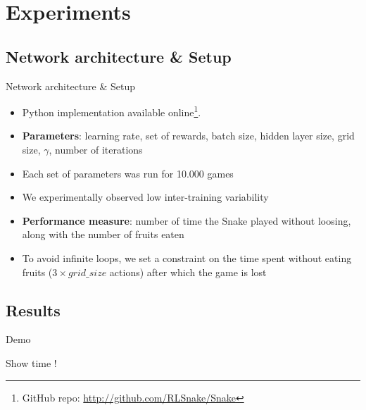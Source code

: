 \documentclass{beamer}
\begin{document}
\section{Experiments}
\subsection{Network architecture \& Setup}

\begin{frame}{Network architecture \& Setup}

\begin{itemize}
\item Python implementation available online\footnote{GitHub repo: \url{http://github.com/RLSnake/Snake}}{}.

\item \textbf{Parameters}: learning rate, set of rewards, batch size, hidden layer size, grid size, $\gamma$, number of  iterations

\item Each set of parameters was run for 10.000 games

\item We experimentally observed low inter-training variability %

\item \textbf{Performance measure}: number of time the Snake played without loosing, along with the number of fruits eaten

\item To avoid infinite loops,  we set a constraint on the time spent without eating fruits ($3 \times grid\_size$ actions) after which the game is lost %



\end{itemize}

\end{frame}

\subsection{Results}

\begin{frame}{Demo}
  \begin{center}
  \Huge Show time !
  \end{center}
\end{frame}
\end{document}
